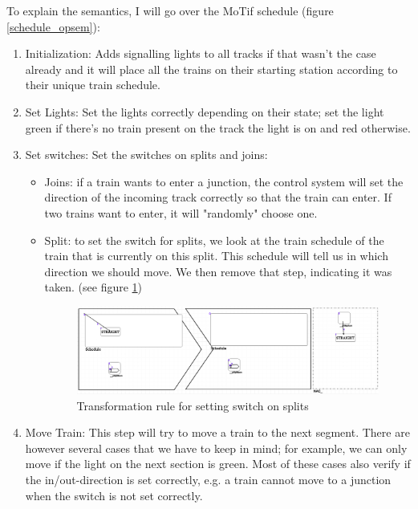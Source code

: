 \documentclass{article}
\begin{document}
To explain the semantics, I will go over the MoTif schedule (figure \ref{schedule_opsem}):

\begin{enumerate}
    \item Initialization: Adds signalling lights to all tracks if that wasn't the case already and it will place all the trains on their starting station according to their unique train schedule.
    \item Set Lights: Set the lights correctly depending on their state; set the light green if there's no train present on the track the light is on and red otherwise.
    \item Set switches: Set the switches on splits and joins:
        \begin{itemize}
            \item Joins: if a train wants to enter a junction, the control system will set the direction of the incoming track correctly so that the train can enter. If two trains want to enter, it will "randomly" choose one.
            \item Split: to set the switch for splits, we look at the train schedule of the train that is currently on this split. This schedule will tell us in which direction we should move. We then remove that step, indicating it was taken. (see figure \ref{set_split_switch})
            \begin{figure}[H]
                \centering
                \includegraphics[width=\textwidth]{images/SetSplitSwitch.png}
                \caption{Transformation rule for setting switch on splits}
                \label{set_split_switch}
            \end{figure}
        \end{itemize}
    \item Move Train: This step will try to move a train to the next segment. There are however several cases that we have to keep in mind; for example, we can only move if the light on the next section is green. Most of these cases also verify if the in/out-direction is set correctly, e.g. a train cannot move to a junction when the switch is not set correctly.

\end{enumerate}
\end{document}
